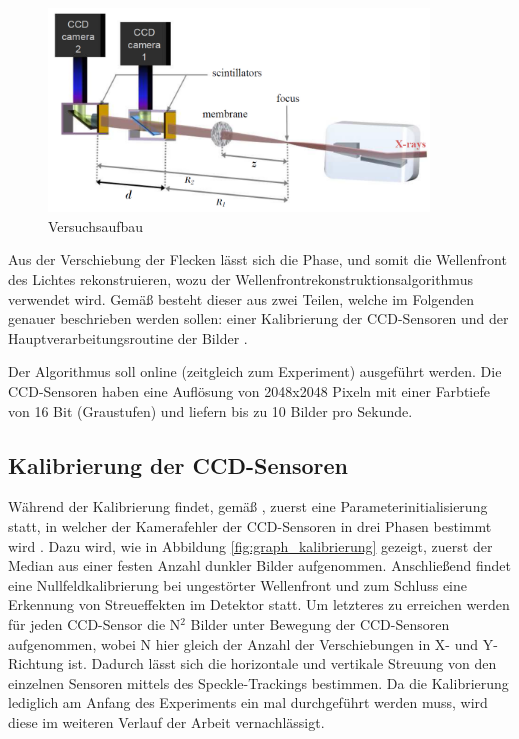 \begin{figure}[htbp]
	\begin{center}
		\includegraphics[width=0.9\textwidth]{img/Versuchsaufbau}
		\caption[Versuchsaufbau]{Versuchsaufbau }
		\label{fig:versuch}
	\end{center}
\end{figure}

Aus der Verschiebung der Flecken lässt sich die Phase, und somit die Wellenfront des Lichtes rekonstruieren, wozu der Wellenfrontrekonstruktionsalgorithmus verwendet wird. Gemäß \citeauthor{Ber13} besteht dieser aus zwei Teilen, welche im Folgenden genauer beschrieben werden sollen: einer Kalibrierung der \gls{CCD}-Sensoren und der Hauptverarbeitungsroutine der Bilder . 

Der Algorithmus soll online (zeitgleich zum Experiment) ausgeführt werden. Die \gls{CCD}-Sensoren haben eine Auflösung von 2048x2048 Pixeln mit einer Farbtiefe von 16 Bit (Graustufen) und liefern bis zu 10 Bilder pro Sekunde.

\subsection{Kalibrierung der CCD-Sensoren}

Während der Kalibrierung findet, gemäß \citeauthor{Ber13}, zuerst eine Parameterinitialisierung statt, in welcher der Kamerafehler der \gls{CCD}-Sensoren in drei Phasen bestimmt wird . Dazu wird, wie in Abbildung \ref{fig:graph_kalibrierung} gezeigt, zuerst der Median aus einer festen Anzahl dunkler Bilder aufgenommen. Anschließend findet eine Nullfeldkalibrierung bei ungestörter Wellenfront und zum Schluss eine Erkennung von Streueffekten im Detektor statt. Um letzteres zu erreichen werden für jeden \gls{CCD}-Sensor die \gls{N}$^2$ Bilder unter Bewegung der \gls{CCD}-Sensoren aufgenommen, wobei \gls{N} hier gleich der Anzahl der Verschiebungen in X- und Y-Richtung ist. Dadurch lässt sich die horizontale und vertikale Streuung von den einzelnen Sensoren mittels des Speckle-Trackings bestimmen. Da die Kalibrierung lediglich am Anfang des Experiments ein mal durchgeführt werden muss, wird diese im weiteren Verlauf der Arbeit vernachlässigt. 


